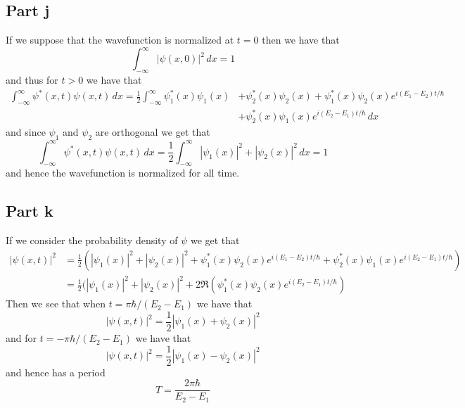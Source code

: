 \documentclass[12pt]{report}
\begin{document}
\subsection*{Part j}
If we suppose that the wavefunction is normalized at $t = 0$ then we have that
\begin{equation*}
  \int_{-\infty}^\infty |\psi(x,0)|^2 \, dx = 1
\end{equation*}
and thus for $t > 0$ we have that
\begin{align*}
  \int_{-\infty}^\infty \psi^*(x,t)\psi(x,t)\, dx = \frac{1}{2}\int_{-\infty}^\infty \psi_1^*(x)\psi_1(x) &+ \psi_2^*(x)\psi_2(x) + \psi_1^*(x)\psi_2(x)e^{i(E_1 - E_2)t/\hbar} \\ &+ \psi_2^*(x)\psi_1(x)e^{i(E_2 - E_1)t/\hbar} \, dx 
\end{align*}
and since $\psi_1$ and $\psi_2$ are orthogonal we get that
\begin{equation*}
  \int_{-\infty}^\infty \psi^*(x,t)\psi(x,t)\, dx = \frac{1}{2}\int_{-\infty}^\infty |\psi_1(x)|^2 + |\psi_2(x)|^2 \, dx = 1
\end{equation*}
and hence the wavefunction is normalized for all time.

\subsection*{Part k}
If we consider the probability density of $\psi$ we get that
\begin{align*}
  |\psi(x,t)|^2 &= \frac{1}{2}(|\psi_1(x)|^2 + |\psi_2(x)|^2 + \psi^*_1(x)\psi_2(x)e^{i(E_1 - E_2)t/\hbar} + \psi^*_2(x)\psi_1(x)e^{i(E_2 - E_1)t/\hbar}) \\
                &= \frac{1}{2}(|\psi_1(x)|^2 + |\psi_2(x)|^2 + 2\Re\left(\psi^*_1(x)\psi_2(x)e^{i(E_2 - E_1)t/\hbar}\right)
\end{align*}
Then we see that when $t = \pi\hbar/(E_2 - E_1)$ we have that
\begin{equation*}
  |\psi(x,t)|^2 = \frac{1}{2}|\psi_1(x) + \psi_2(x)|^2
\end{equation*}
and for $t = -\pi\hbar/(E_2 - E_1)$ we have that
\begin{equation*}
  |\psi(x,t)|^2 = \frac{1}{2}|\psi_1(x) - \psi_2(x)|^2
\end{equation*}
and hence has a period
\begin{equation*}
  T = \frac{2\pi\hbar}{E_2 - E_1}
\end{equation*}
\end{document}
